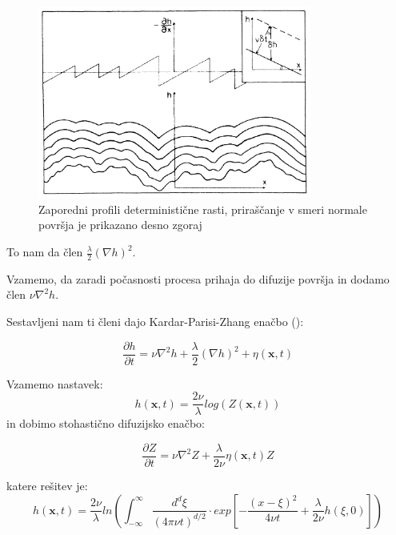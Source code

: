 \documentclass[a4paper, twoside, 12pt]{book}
\begin{document}
            \begin{figure}[h]
              \begin{center}
                \includegraphics[width=9cm]{slike/kpz}
              \end{center}
              \caption{Zaporedni profili deterministične rasti, priraščanje v smeri normale površja je prikazano desno zgoraj}
              \label{fig:kpz}
            \end{figure}

            To nam da člen $\frac{\lambda}{2} (\nabla h)^2$.

            Vzamemo, da zaradi počasnosti procesa prihaja do difuzije površja in dodamo člen $\nu \nabla^2 h$.

            Sestavljeni nam ti členi dajo Kardar-Parisi-Zhang enačbo (\cite{kardar1986dynamic}):

            \begin{equation}
              \frac{\partial h}{\partial t} = \nu \nabla^2 h + \frac{\lambda}{2} (\nabla h)^2 + \eta (\mathbf{x},t)
              \label{KPZ}
            \end{equation}

            Vzamemo nastavek:
        \begin{equation}
            h(\mathbf{x},t) = \frac{2 \nu}{\lambda} log(Z(\mathbf{x},t))
        \end{equation}
            in dobimo stohastično difuzijsko enačbo:

        \begin{equation}
            \frac{\partial Z}{\partial t} = \nu \nabla^2 Z + \frac{\lambda}{2 \nu} \eta(\mathbf{x},t) Z
        \end{equation}

        katere rešitev je:
        \begin{equation}
            h(\mathbf{x},t) = \frac{2 \nu}{\lambda} ln \left( \int_{-\infty}^{\infty} \frac{d^d \xi}{(4 \pi \nu t)^{d/2}} \cdot exp \left[-\frac{(x-\xi)^2}{4 \nu t} + \frac{\lambda}{2 \nu}h(\xi,0) \right] \right)
        \end{equation}
\end{document}
